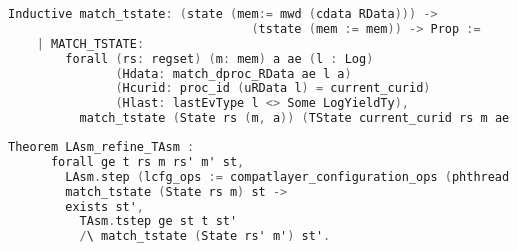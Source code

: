 \begin{lstlisting}[language=C]
    Inductive match_tstate: (state (mem:= mwd (cdata RData))) -> 
                                  (tstate (mem := mem)) -> Prop :=
    | MATCH_TSTATE:
        forall (rs: regset) (m: mem) a ae (l : Log)
               (Hdata: match_dproc_RData ae l a)
               (Hcurid: proc_id (uRData l) = current_curid)
               (Hlast: lastEvType l <> Some LogYieldTy),
          match_tstate (State rs (m, a)) (TState current_curid rs m ae l).
\end{lstlisting}

\begin{lstlisting}[language=C]
    Theorem LAsm_refine_TAsm :
      forall ge t rs m rs' m' st, 
        LAsm.step (lcfg_ops := compatlayer_configuration_ops (phthread <@$\oplus$@> L64)) ge (State rs m) t (State rs' m') ->
        match_tstate (State rs m) st ->
        exists st',        
          TAsm.tstep ge st t st'
          /\ match_tstate (State rs' m') st'.
\end{lstlisting}

